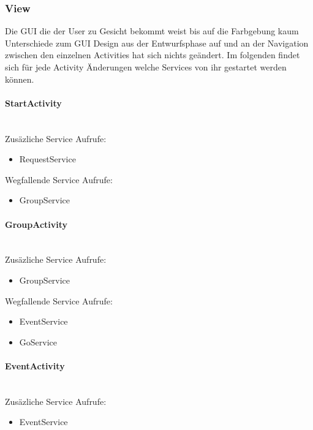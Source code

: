 \documentclass{scrartcl}
\begin{document}
	\subsubsection{View}
	Die GUI die der User zu Gesicht bekommt weist bis auf die Farbgebung kaum Unterschiede zum GUI Design aus der Entwurfsphase auf und an der Navigation zwischen den einzelnen Activities hat sich nichts geändert.
Im folgenden findet sich für jede Activity Änderungen welche Services von ihr gestartet werden können. 
	
	\paragraph{StartActivity}$~~$\\
	Zusäzliche Service Aufrufe:
	\begin{itemize}
	\item RequestService
	\end{itemize}
	Wegfallende Service Aufrufe:
	\begin{itemize}
	\item GroupService
	\end{itemize}

	\paragraph{GroupActivity}$~~$\\

	Zusäzliche Service Aufrufe:
	\begin{itemize}
	\item GroupService
	\end{itemize}
	Wegfallende Service Aufrufe:
	\begin{itemize}
	\item EventService
	\item GoService
	\end{itemize}

	\paragraph{EventActivity}$~~$\\

	Zusäzliche Service Aufrufe:
	\begin{itemize}
	\item EventService
	\end{itemize}
 
\end{document}
